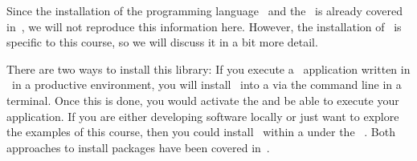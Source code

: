 %
\label{sec:installPsycopg}%
%
Since the installation of the programming language \python\ and the  \pycharm\ is already covered in~\cite{programmingWithPython}, we will not reproduce this information here.
However, the installation of \psycopg\ is specific to this course, so we will discuss it in a bit more detail.

There are two ways to install this library:
If you execute a \db\ application written in \python\ in a productive environment, you will install \psycopg\ into a  via the command line in a terminal.
Once this is done, you would activate the  and be able to execute your application.
If you are either developing software locally or just want to explore the examples of this course, then you could install \psycopg\ within a  under the \pycharm\ .
Both approaches to install packages have been covered in~\cite{programmingWithPython}.

